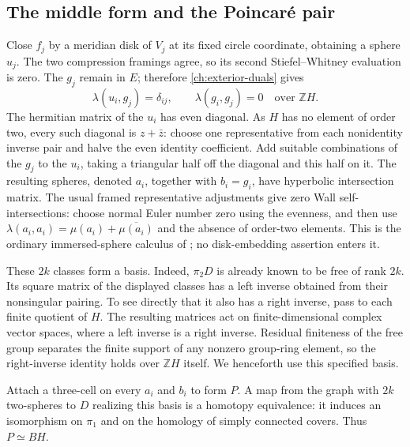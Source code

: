 \documentclass[11pt]{article}
\theoremstyle{definition}
\theoremstyle{remark}
\newcommand{\Z}{\mathbb Z}
\begin{document}
\subsection{The middle form and the Poincar\'e pair}
\label{ch:duality}

Close $f_j$ by a meridian disk of $V_j$ at its fixed circle coordinate,
obtaining a sphere $u_j$.  The two compression framings agree, so its
second Stiefel--Whitney evaluation is zero.  The $g_j$ remain in $E$;
therefore \eqref{ch:exterior-duals} gives
\[
 \lambda(u_i,g_j)=\delta_{ij},\qquad \lambda(g_i,g_j)=0
 \quad\text{over }\Z H.
\]
The hermitian matrix of the $u_i$ has even diagonal.  As $H$ has no
element of order two, every such diagonal is $z+\bar z$: choose one
representative from each nonidentity inverse pair and halve the even
identity coefficient.  Add suitable combinations of the $g_j$ to the
$u_i$, taking a triangular half off the diagonal and this half on it.
The resulting spheres, denoted $a_i$, together with $b_i=g_i$, have
hyperbolic intersection matrix.  The usual framed representative
adjustments give zero Wall self-intersections: choose normal Euler
number zero using the evenness, and then use
$\lambda(a_i,a_i)=\mu(a_i)+\overline{\mu(a_i)}$ and the absence of
order-two elements.  This is the ordinary immersed-sphere calculus
of \cite{FQ}; no disk-embedding assertion enters it.

These $2k$ classes form a basis.  Indeed, $\pi_2D$ is already known
to be free of rank $2k$.  Its square matrix of the displayed classes
has a left inverse obtained from their nonsingular pairing.  To see
directly that it also has a right inverse, pass to each finite quotient
of $H$.  The resulting matrices act on finite-dimensional complex
vector spaces, where a left inverse is a right inverse.  Residual
finiteness of the free group separates the finite support of any
nonzero group-ring element, so the right-inverse identity holds over
$\Z H$ itself.  We henceforth use this specified basis.

Attach a three-cell on every $a_i$ and $b_i$ to form $P$.  A map from
the graph with $2k$ two-spheres to $D$ realizing this basis is a
homotopy equivalence: it induces an isomorphism on $\pi_1$ and on the
homology of simply connected covers.  Thus $P\simeq BH$.
\end{document}
